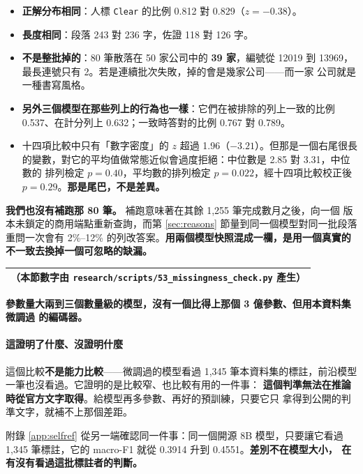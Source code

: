 \documentclass[11pt,a4paper]{ctexart}
\newcommand{\fn}[1]{\texttt{#1}}
\begin{document}
\begin{itemize}[leftmargin=2em, itemsep=1pt]
  \item \textbf{正解分布相同}：人標 \fn{Clear} 的比例 0.812 對 0.829（$z = -0.38$）。
  \item \textbf{長度相同}：段落 243 對 236 字，佐證 118 對 126 字。
  \item \textbf{不是整批掉的}：80 筆散落在 50 家公司中的 \textbf{39 家}，編號從
        12019 到 13969，最長連號只有 2。若是連續批次失敗，掉的會是幾家公司——而一家
        公司就是一種書寫風格。
  \item \textbf{另外三個模型在那些列上的行為也一樣}：它們在被排除的列上一致的比例
        0.537、在計分列上 0.632；一致時答對的比例 0.767 對 0.789。
  \item 十四項比較中只有「數字密度」的 $z$ 超過 1.96（$-3.21$）。但那是一個右尾很長
        的變數，對它的平均值做常態近似會過度拒絕：中位數是 2.85 對 3.31，中位數的
        排列檢定 $p = 0.40$，平均數的排列檢定 $p = 0.022$，經十四項比較校正後
        $p = 0.29$。\textbf{那是尾巴，不是差異。}
\end{itemize}

\medskip
\textbf{我們也沒有補跑那 80 筆。} 補跑意味著在其餘 1{,}255 筆完成數月之後，向一個
版本未鎖定的商用端點重新查詢，而第 \ref{sec:reasons} 節量到同一個模型對同一批段落
重問一次會有 2\%--12\% 的列改答案。\textbf{用兩個模型快照混成一欄，是用一個真實的
不一致去換掉一個可忽略的缺漏。}

\begin{table}[h]
\centering\small
\begin{tabular}{@{}l@{}}
\toprule
（本節數字由 \fn{research/scripts/53\_missingness\_check.py} 產生）\\
\bottomrule
\end{tabular}
\end{table}

\textbf{參數量大兩到三個數量級的模型，沒有一個比得上那個 3 億參數、但用本資料集微調過
的編碼器。}

\paragraph{這證明了什麼、沒證明什麼} 這個比較\textbf{不是能力比較}——微調過的模型看過
1{,}345 筆本資料集的標註，前沿模型一筆也沒看過。它證明的是比較窄、也比較有用的一件事：
\textbf{這個判準無法在推論時從官方文字取得}。給模型再多參數、再好的預訓練，只要它只
拿得到公開的判準文字，就補不上那個差距。

\medskip
附錄 \ref{app:selfref} 從另一端確認同一件事：同一個開源 8B 模型，只要讓它看過
1{,}345 筆標註，它的 macro-F1 就從 0.3914 升到 0.4551。\textbf{差別不在模型大小，
在有沒有看過這批標註者的判斷。}
\end{document}
